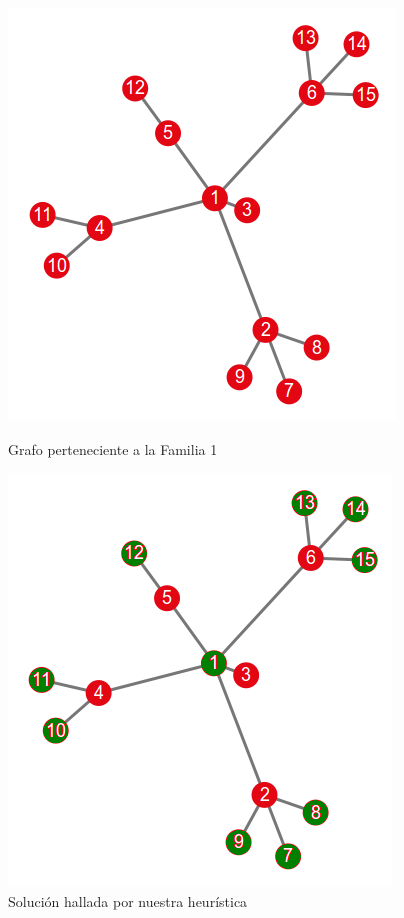 \begin{figure}[!htb]
\begin{center}
  \includegraphics[scale=0.5]{imagenes/familia1.png}
\end{center}
  \caption{Grafo perteneciente a la Familia 1}\label{fig:familia1}
\endminipage\hfill
{}
\begin{center}
  \includegraphics[scale=0.5]{imagenes/familia1-res.png}
\end{center}
  \caption{Solución hallada por nuestra heurística}\label{fig:familia1res}
\endminipage
\end{figure}

